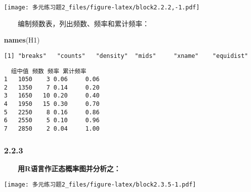 \documentclass[
]{article}
\newenvironment{Shaded}{\begin{snugshade}}{\end{snugshade}}
\newcommand{\DecValTok}[1]{\textcolor[rgb]{0.00,0.00,0.81}{#1}}
\newcommand{\FloatTok}[1]{\textcolor[rgb]{0.00,0.00,0.81}{#1}}
\newcommand{\KeywordTok}[1]{\textcolor[rgb]{0.13,0.29,0.53}{\textbf{#1}}}
\newcommand{\NormalTok}[1]{#1}
\newcommand{\OperatorTok}[1]{\textcolor[rgb]{0.81,0.36,0.00}{\textbf{#1}}}
\newcommand{\StringTok}[1]{\textcolor[rgb]{0.31,0.60,0.02}{#1}}
\begin{document}
\texttt{[image: 多元练习题2\_files/figure-latex/block2.2.2,-1.pdf]}

　　编制频数表，列出频数、频率和累计频率：

\begin{Shaded}
\begin{Highlighting}[]
\KeywordTok{names}\NormalTok{(H1)}
\end{Highlighting}
\end{Shaded}

\begin{verbatim}
[1] "breaks"   "counts"   "density"  "mids"     "xname"    "equidist"
\end{verbatim}

\begin{Shaded}
\end{Shaded}

\begin{verbatim}
  组中值 频数 频率 累计频率
1   1050    3 0.06     0.06
2   1350    7 0.14     0.20
3   1650   10 0.20     0.40
4   1950   15 0.30     0.70
5   2250    8 0.16     0.86
6   2550    5 0.10     0.96
7   2850    2 0.04     1.00
\end{verbatim}

\hypertarget{section-3}{%
\subsubsection{2.2.3}\label{section-3}}

　　\textbf{用R语言作正态概率图并分析之：}

\begin{Shaded}
\end{Shaded}

\texttt{[image: 多元练习题2\_files/figure-latex/block2.3.5-1.pdf]}
\end{document}
